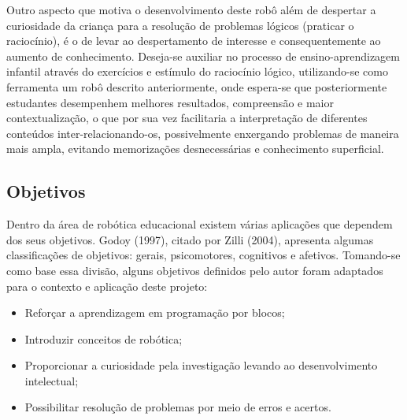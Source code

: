 Outro aspecto que motiva o desenvolvimento deste robô além de despertar a curiosidade da criança para a resolução de problemas lógicos (praticar o raciocínio), é o de levar ao despertamento de interesse e consequentemente ao aumento de conhecimento.
Deseja-se auxiliar no processo de ensino-aprendizagem infantil através do exercícios e estímulo do raciocínio lógico, utilizando-se como ferramenta um robô descrito anteriormente, onde espera-se que posteriormente estudantes desempenhem melhores resultados, compreensão e maior contextualização, o que por sua vez facilitaria a interpretação de diferentes conteúdos inter-relacionando-os, possivelmente enxergando problemas de maneira mais ampla, evitando memorizações desnecessárias e conhecimento superficial.

\subsection{Objetivos}

Dentro da área de robótica educacional existem várias aplicações que dependem dos seus objetivos. Godoy (1997), citado por Zilli (2004), apresenta algumas classificações de objetivos: gerais, psicomotores, cognitivos e afetivos. Tomando-se como base essa divisão, alguns objetivos definidos pelo autor foram adaptados para o contexto e aplicação deste projeto:

\begin{itemize}
  \item Reforçar a aprendizagem em programação por blocos;
  \item Introduzir conceitos de robótica;
  \item Proporcionar a curiosidade pela investigação levando ao desenvolvimento intelectual;
  \item Possibilitar resolução de problemas por meio de erros e acertos.
\end{itemize}

